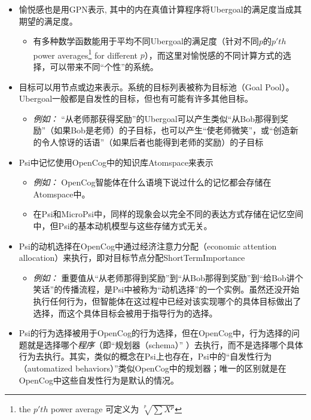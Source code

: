 \begin{itemize}
\begin{itemize}
\end{itemize}

\item 愉悦感也是用GPN表示, 其中的内在真值计算程序将Ubergoal的满足度当成其期望的满足度。

\begin{itemize}
\item 有多种数学函数能用于平均不同Ubergoal的满足度（针对不同$p$的$p'th$ power averages\footnote{the $p'th$ power average 可定义为 $\sqrt[p]{\sum X^p}$} for different $p$），而这里对愉悦感的不同计算方式的选择，可以带来不同“个性”的系统。

\end{itemize}

\item 目标可以用节点或边来表示。系统的目标列表被称为目标池（Goal Pool）。Ubergoal一般都是自发性的目标，但也有可能有许多其他目标。

\begin{itemize}
\item {\it 例如：} “从老师那获得奖励”的Ubergoal可以产生类似“从Bob那得到奖励”（如果Bob是老师）的子目标，也可以产生“使老师微笑”，或“创造新的令人惊讶的话语”（如果后者也能得到老师的奖励）的子目标
\end{itemize}

\item Psi中记忆使用OpenCog中的知识库Atomspace来表示
\begin{itemize}
\item {\it 例如：} OpenCog智能体在什么语境下说过什么的记忆都会存储在Atomspace中。

\item 在Psi和MicroPsi中，同样的现象会以完全不同的表达方式存储在记忆空间中，但Psi的基本动机模型与这些存储方式无关。

\end{itemize}

\item Psi的动机选择在OpenCog中通过经济注意力分配（economic attention allocation）来执行，即对目标节点分配ShortTermImportance  

\begin{itemize}
\item {\it 例如：} 重要值从“从老师那得到奖励”到“从Bob那得到奖励”到“给Bob讲个笑话”的传播流程，是Psi中被称为“动机选择”的一个实例。虽然还没开始执行任何行为，但智能体在这过程中已经对该实现哪个的具体目标做出了选择，而这个具体目标会被用于指导行为的选择。
\end{itemize} 

\item Psi的行为选择被用于OpenCog的行为选择，但在OpenCog中，行为选择的问题就是选择哪个{\it 程序}（即“规划器（schema）” ）去执行，而不是选择哪个具体行为去执行。其实，类似的概念在Psi上也存在，Psi中的“自发性行为（automatized behaviors）”类似OpenCog中的规划器；唯一的区别就是在OpenCog中这些自发性行为是默认的情况。


\end{itemize}
